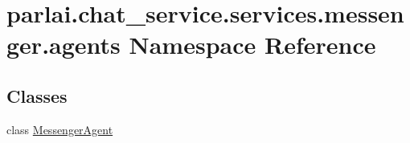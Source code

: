 \hypertarget{namespaceparlai_1_1chat__service_1_1services_1_1messenger_1_1agents}{}\section{parlai.\+chat\+\_\+service.\+services.\+messenger.\+agents Namespace Reference}
\label{namespaceparlai_1_1chat__service_1_1services_1_1messenger_1_1agents}
\subsection*{Classes}
\begin{DoxyCompactItemize}
\item 
class \hyperlink{classparlai_1_1chat__service_1_1services_1_1messenger_1_1agents_1_1MessengerAgent}{Messenger\+Agent}
\end{DoxyCompactItemize}
